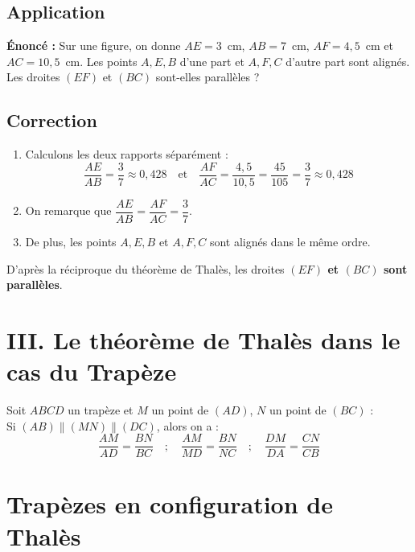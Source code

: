 \documentclass[12pt,a4paper]{article}
\begin{document}
\subsection*{\color{myred}Application}
\textbf{Énoncé :} 
Sur une figure, on donne $AE = 3$~cm, $AB = 7$~cm, $AF = 4{,}5$~cm et $AC = 10{,}5$~cm. Les points $A, E, B$ d'une part et $A, F, C$ d'autre part sont alignés. Les droites $(EF)$ et $(BC)$ sont-elles parallèles ?

\subsection*{\color{myred}Correction}
\begin{enumerate}
    \item Calculons les deux rapports séparément :
    $$\dfrac{AE}{AB} = \dfrac{3}{7} \approx 0{,}428 \quad \text{et} \quad \dfrac{AF}{AC} = \dfrac{4{,}5}{10{,}5} = \dfrac{45}{105} = \dfrac{3}{7} \approx 0{,}428$$
    \item On remarque que $\dfrac{AE}{AB} = \dfrac{AF}{AC} = \dfrac{3}{7}$.
    \item De plus, les points $A, E, B$ et $A, F, C$ sont alignés dans le même ordre.
\end{enumerate}
D'après la réciproque du théorème de Thalès, les droites \textbf{$(EF)$ et $(BC)$ sont parallèles}.

\section*{\color{myred}III. Le théorème de Thalès dans le cas du Trapèze}

\noindent
Soit $ABCD$ un trapèze et $M$ un point de $(AD)$, $N$ un point de $(BC)$ :\\
Si $(AB) \parallel (MN) \parallel (DC)$, alors on a :
\[
\dfrac{AM}{AD} = \dfrac{BN}{BC} \quad ; \quad \dfrac{AM}{MD} = \dfrac{BN}{NC} \quad ; \quad \dfrac{DM}{DA} = \dfrac{CN}{CB}
\]

\vspace{0.5cm}
\section*{Trapèzes en configuration de Thalès}
\end{document}
